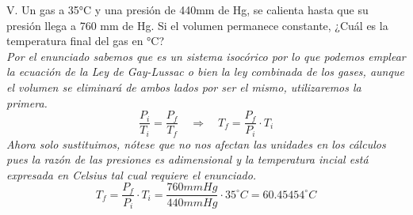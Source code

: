 \documentclass{article}
\newcommand{\cls}{^{\circ}}
\begin{document}
\newpage
V. Un gas a 35°C y una presión de 440mm de Hg, se calienta hasta que su presión llega a 760 mm de Hg. Si el volumen permanece constante, ¿Cuál es la temperatura final del gas en °C? \\
\textit{Por el enunciado sabemos que es un sistema isocórico por lo que podemos emplear la ecuación de la Ley de Gay-Lussac o bien la ley combinada de los gases, aunque el volumen se eliminará de ambos lados por ser el mismo, utilizaremos la primera.}
\begin{equation}
    \frac{P_i}{T_i} = \frac{P_f}{T_f} \quad \Rightarrow \quad T_f = \frac{P_f}{P_i} \cdot T_i
\end{equation}
\textit{Ahora solo sustituimos, nótese que no nos afectan las unidades en los cálculos pues la razón de las presiones es adimensional y la temperatura incial está expresada en Celsius tal cual requiere el enunciado.}
\begin{equation*}
    T_f = \frac{P_f}{P_i} \cdot T_i = \frac{760 mmHg}{440 mmHg} \cdot 35 \cls C = 60.45454 \cls C
\end{equation*}
\end{document}
